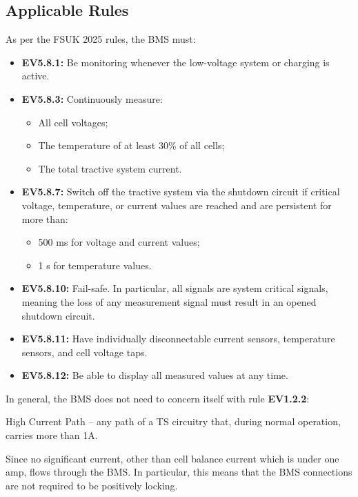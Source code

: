\documentclass[12pt]{article}
\begin{document}
\subsection{Applicable Rules}
As per the FSUK 2025 rules, the BMS must:
\begin{itemize}
\item\textbf{EV5.8.1:} Be monitoring whenever the low-voltage system or charging is active.
\item\textbf{EV5.8.3:} Continuously measure:
  \begin{itemize}
  \item All cell voltages;
  \item The temperature of at least 30\% of all cells;
  \item The total tractive system current.
  \end{itemize}
\item\textbf{EV5.8.7:} Switch off the tractive system via the shutdown circuit if critical voltage, temperature, or current values are reached and are persistent for more than:
  \begin{itemize}
  \item 500 ms for voltage and current values;
  \item 1 s for temperature values.
  \end{itemize}
\item\textbf{EV5.8.10:} Fail-safe.
  In particular, all signals are system critical signals, meaning the loss of any measurement signal must result in an opened shutdown circuit.
\item\textbf{EV5.8.11:} Have individually disconnectable current sensors, temperature sensors, and cell voltage taps.
\item\textbf{EV5.8.12:} Be able to display all measured values at any time.
\end{itemize}

In general, the BMS does not need to concern itself with rule \textbf{EV1.2.2}:
\begin{displayquote}
  High Current Path -- any path of a TS circuitry that, during normal operation, carries more than 1A.
\end{displayquote}
Since no significant current, other than cell balance current which is under one amp, flows through the BMS.
In particular, this means that the BMS connections are not required to be positively locking.
\end{document}
